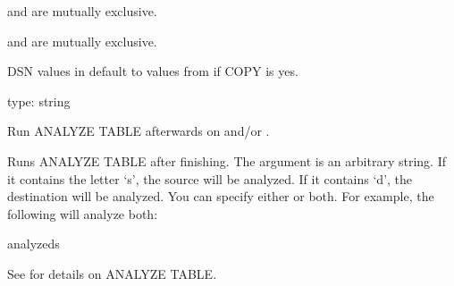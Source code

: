 \documentclass[letterpaper,10pt,english]{sphinxmanual}
\begin{document}
\sphinxAtStartPar
{\hyperref[\detokenize{mariadb-archiver:cmdoption-mariadb-archiver-analyze}]{}} and {\hyperref[\detokenize{mariadb-archiver:cmdoption-mariadb-archiver-optimize}]{}} are mutually exclusive.

\sphinxAtStartPar
{\hyperref[\detokenize{mariadb-archiver:cmdoption-mariadb-archiver-no-ascend}]{}} and {\hyperref[\detokenize{mariadb-archiver:cmdoption-mariadb-archiver-no-delete}]{}} are mutually exclusive.

\sphinxAtStartPar
DSN values in {\hyperref[\detokenize{mariadb-archiver:cmdoption-mariadb-archiver-dest}]{}} default to values from {\hyperref[\detokenize{mariadb-archiver:cmdoption-mariadb-archiver-source}]{}} if COPY is yes.

\begin{fulllineitems}
\label{\detokenize{mariadb-archiver:cmdoption-mariadb-archiver-analyze}}
\sphinxAtStartPar
type: string

\sphinxAtStartPar
Run ANALYZE TABLE afterwards on {\hyperref[\detokenize{mariadb-archiver:cmdoption-mariadb-archiver-source}]{}} and/or {\hyperref[\detokenize{mariadb-archiver:cmdoption-mariadb-archiver-dest}]{}}.

\sphinxAtStartPar
Runs ANALYZE TABLE after finishing.  The argument is an arbitrary string.  If it
contains the letter ‘s’, the source will be analyzed.  If it contains ‘d’, the
destination will be analyzed.  You can specify either or both.  For example, the
following will analyze both:

\begin{sphinxVerbatim}[commandchars=\\\{\}]
\PYGZhy{}\PYGZhy{}analyzeds
\end{sphinxVerbatim}

\sphinxAtStartPar
See  for details on ANALYZE
TABLE.

\end{fulllineitems}
\end{document}
